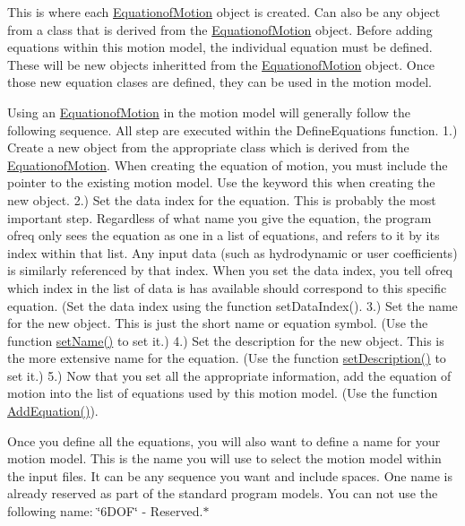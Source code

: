 This is where each \hyperlink{classosea_1_1ofreq_1_1_equationof_motion}{Equationof\-Motion} object is created. Can also be any object from a class that is derived from the \hyperlink{classosea_1_1ofreq_1_1_equationof_motion}{Equationof\-Motion} object. Before adding equations within this motion model, the individual equation must be defined. These will be new objects inheritted from the \hyperlink{classosea_1_1ofreq_1_1_equationof_motion}{Equationof\-Motion} object. Once those new equation clases are defined, they can be used in the motion model.

Using an \hyperlink{classosea_1_1ofreq_1_1_equationof_motion}{Equationof\-Motion} in the motion model will generally follow the following sequence. All step are executed within the Define\-Equations function. 1.) Create a new object from the appropriate class which is derived from the \hyperlink{classosea_1_1ofreq_1_1_equationof_motion}{Equationof\-Motion}. When creating the equation of motion, you must include the pointer to the existing motion model. Use the keyword this when creating the new object. 2.) Set the data index for the equation. This is probably the most important step. Regardless of what name you give the equation, the program ofreq only sees the equation as one in a list of equations, and refers to it by its index within that list. Any input data (such as hydrodynamic or user coefficients) is similarly referenced by that index. When you set the data index, you tell ofreq which index in the list of data is has available should correspond to this specific equation. (Set the data index using the function set\-Data\-Index(). 3.) Set the name for the new object. This is just the short name or equation symbol. (Use the function \hyperlink{classosea_1_1ofreq_1_1_motion_model_a42d989727028c18c59ba04f958bc7b74}{set\-Name()} to set it.) 4.) Set the description for the new object. This is the more extensive name for the equation. (Use the function \hyperlink{classosea_1_1ofreq_1_1_motion_model_a5097540bb98ad753594d41890e6ef30d}{set\-Description()} to set it.) 5.) Now that you set all the appropriate information, add the equation of motion into the list of equations used by this motion model. (Use the function \hyperlink{classosea_1_1ofreq_1_1_motion_model_a73489d88c07b26109bbb9bdd0a576b30}{Add\-Equation()}).

Once you define all the equations, you will also want to define a name for your motion model. This is the name you will use to select the motion model within the input files. It can be any sequence you want and include spaces. One name is already reserved as part of the standard program models. You can not use the following name\-: \char`\"{}6\-D\-O\-F\char`\"{} -\/ Reserved.$\ast$

